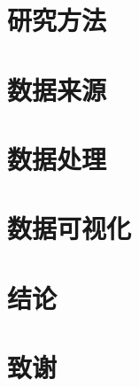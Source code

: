 \documentclass[12pt, a4paper, oneside]{ctexart}
\begin{document}
\section{研究方法}
\section{数据来源}
\section{数据处理}
\section{数据可视化}
\section{结论}
\section{致谢}
\end{document}
